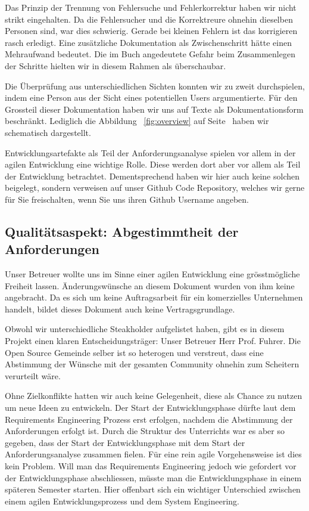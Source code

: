 \documentclass[11pt,titelpage]{scrartcl}
\begin{document}
Das Prinzip der Trennung von Fehlersuche und Fehlerkorrektur haben wir nicht strikt eingehalten. Da die Fehlersucher und
die Korrektreure ohnehin dieselben Personen sind, war dies schwierig. Gerade bei kleinen Fehlern ist das korrigieren
rasch erledigt. Eine zusätzliche Dokumentation als Zwischenschritt hätte einen Mehraufwand bedeutet. Die im Buch
angedeutete Gefahr beim Zusammenlegen der Schritte hielten wir in diesem Rahmen als überschaubar.

Die Überprüfung aus unterschiedlichen Sichten konnten wir zu zweit durchspielen, indem eine Person aus der Sicht eines
potentiellen Users argumentierte. Für den Grossteil dieser Dokumentation haben wir uns auf Texte als Dokumentationsform
beschränkt. Lediglich die Abbildung ~\ref{fig:overview} auf Seite~\pageref{fig:overview} haben wir schematisch dargestellt.

Entwicklungsartefakte als Teil der Anforderungsanalyse spielen vor allem in der agilen Entwicklung eine wichtige Rolle.
Diese werden dort aber vor allem als Teil der Entwicklung  betrachtet. Dementsprechend haben wir hier auch keine solchen
beigelegt, sondern verweisen auf unser Github Code Repository, welches wir gerne für Sie freischalten, wenn Sie uns ihren
Github Username angeben.


\subsection{Qualitätsaspekt: Abgestimmtheit der Anforderungen}
Unser Betreuer wollte uns im Sinne einer agilen Entwicklung eine grösstmögliche Freiheit lassen. Änderungswünsche an
diesem Dokument wurden von ihm keine angebracht. Da es sich um keine Auftragsarbeit für ein komerzielles Unternehmen
handelt, bildet dieses Dokument auch keine Vertragsgrundlage.

Obwohl wir unterschiedliche Steakholder aufgelistet haben, gibt es in diesem Projekt einen klaren Entscheidungsträger:
Unser Betreuer Herr Prof. Fuhrer. Die Open Source Gemeinde selber ist so heterogen und verstreut, dass  eine
Abstimmung der Wünsche mit der gesamten Community ohnehin zum Scheitern verurteilt wäre.

Ohne Zielkonflikte hatten wir auch keine Gelegenheit, diese als Chance zu nutzen um neue Ideen zu entwickeln. Der Start
der Entwicklungsphase dürfte laut dem Requirements Engineering Prozess erst erfolgen, nachdem die Abstimmung der
Anforderungen erfolgt ist. Durch die Struktur des Unterrichts war es aber so gegeben, dass der Start der
Entwicklungsphase  mit dem Start der Anforderungsanalyse zusammen fielen. Für eine rein agile Vorgehensweise ist dies
kein Problem. Will man das Requirements Engineering jedoch wie gefordert vor der Entwicklungsphase abschliessen, müsste
man die Entwicklungsphase in einem späteren Semester starten. Hier offenbart sich ein wichtiger Unterschied zwischen
einem agilen Entwicklungsprozess und dem System Engineering.
\end{document}
